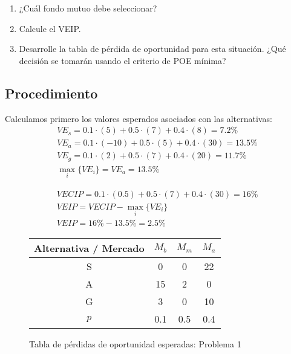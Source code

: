 \documentclass{article}
\begin{document}
        \begin{enumerate} 
            \item ¿Cuál fondo mutuo debe seleccionar?
            \item Calcule el VEIP.
            \item Desarrolle la tabla de pérdida de oportunidad para esta situación. ¿Qué decisión se tomarán usando  el criterio de POE mínima?
        \end{enumerate}

        \subsection{Procedimiento}

            Calculamos primero los valores esperados asociados con las alternativas:
            \begin{gather*}
                VE_s = 0.1 \cdot (5) + 0.5 \cdot (7) + 0.4 \cdot (8) = 7.2\% \\
                VE_a = 0.1 \cdot (-10) + 0.5 \cdot (5) + 0.4 \cdot (30) = 13.5\% \\
                VE_g = 0.1 \cdot (2) + 0.5 \cdot (7) + 0.4 \cdot (20) = 11.7\% \\
                \max_i \{VE_i\} = VE_a = 13.5\%
            \end{gather*}

            \begin{gather*}
                VECIP = 0.1 \cdot (0.5) + 0.5 \cdot (7) + 0.4 \cdot (30) = 16\% \\
                VEIP = VECIP - \max_i \{VE_i\} \\
                VEIP = 16\% - 13.5\% = 2.5\%
            \end{gather*}

            \begin{figure}[htbp!]
                \centering
                \begin{tabular}{ |cccc| }
                    \hline
                    Alternativa / Mercado & $M_b$ & $M_m$ & $M_a$ \\
                    \hline
                    S & 0 & 0 & 22 \\
                    \hline
                    A & 15 & 2 & 0 \\
                    \hline
                    G & 3 & 0 & 10 \\
                    \hline
                    $p$ & 0.1 & 0.5 & 0.4 \\
                    \hline
                \end{tabular}
                \caption{Tabla de pérdidas de oportunidad esperadas: Problema 1}
                \label{tabla:poe2}
            \end{figure}
\end{document}
